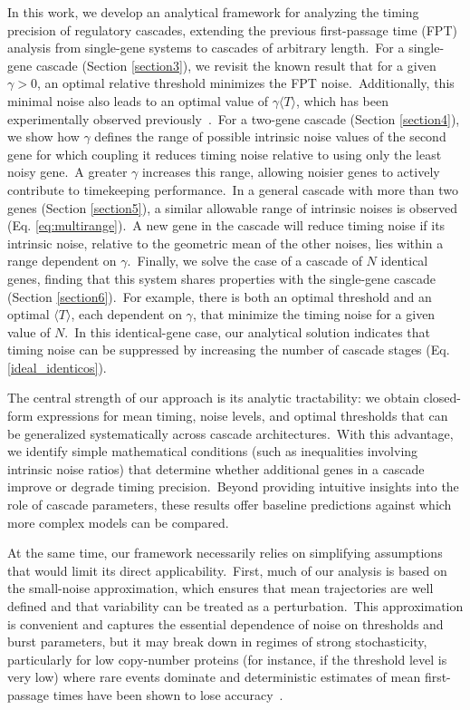 \documentclass[aps,prb,reprint,superscriptaddress]{revtex4-2}
\begin{document}
In this work, we develop an analytical framework for analyzing the timing precision of regulatory cascades, extending the previous first-passage time (FPT) analysis from single-gene systems to cascades of arbitrary length.~For a single-gene cascade (Section \ref{section3}), we revisit the known result that for a given $\gamma>0$, an optimal relative threshold minimizes the FPT noise.~Additionally, this minimal noise also leads to an optimal value of $\gamma\langle T\rangle$, which has been experimentally observed previously~\cite{kannoly2020optimum}.~For a two-gene cascade (Section \ref{section4}), we show how $\gamma$ defines the range of possible intrinsic noise values of the second gene for which coupling it reduces timing noise relative to using only the least noisy gene.~A greater $\gamma$ increases this range, allowing noisier genes to actively contribute to timekeeping performance.~In a general cascade with more than two genes (Section \ref{section5}), a similar allowable range of intrinsic noises is observed (Eq. \eqref{eq:multirange}).~A new gene in the cascade will reduce timing noise if its intrinsic noise, relative to the geometric mean of the other noises, lies within a range dependent on $\gamma$.~Finally, we solve the case of a cascade of $N$ identical genes, finding that this system shares properties with the single-gene cascade (Section \ref{section6}).~For example, there is both an optimal threshold and an optimal $\langle T\rangle$, each dependent on $\gamma$, that minimize the timing noise for a given value of $N$.~In this identical-gene case, our analytical solution indicates that timing noise can be suppressed by increasing the number of cascade stages (Eq. \eqref{ideal_identicos}).

The central strength of our approach is its analytic tractability: we obtain closed-form expressions for mean timing, noise levels, and optimal thresholds that can be generalized systematically across cascade architectures.~With this advantage, we identify simple mathematical conditions (such as inequalities involving intrinsic noise ratios) that determine whether additional genes in a cascade improve or degrade timing precision.~Beyond providing intuitive insights into the role of cascade parameters, these results offer baseline predictions against which more complex models can be compared.

At the same time, our framework necessarily relies on simplifying assumptions that would limit its direct applicability.~First, much of our analysis is based on the small-noise approximation, which ensures that mean trajectories are well defined and that variability can be treated as a perturbation.~This approximation is convenient and captures the essential dependence of noise on thresholds and burst parameters, but it may break down in regimes of strong stochasticity, particularly for low copy-number proteins (for instance, if the threshold level is very low) where rare events dominate and deterministic estimates of mean first-passage times have been shown to lose accuracy~\cite{grima_fpt}.
\end{document}
